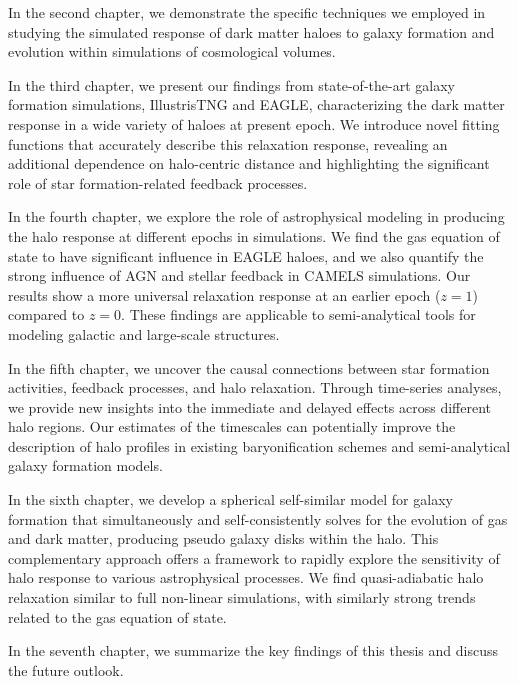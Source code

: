 \documentclass[a4paper, 12pt, oneside]{Thesis}  %
\begin{document}
In the second chapter, we demonstrate the specific techniques we employed in studying the simulated response of dark matter haloes to galaxy formation and evolution within simulations of cosmological volumes.

In the third chapter, we present our findings from state-of-the-art galaxy formation simulations, IllustrisTNG and EAGLE, characterizing the dark matter response in a wide variety of haloes at present epoch. We introduce novel fitting functions that accurately describe this relaxation response, revealing an additional dependence on halo-centric distance and highlighting the significant role of star formation-related feedback processes.

In the fourth chapter, we explore the role of astrophysical modeling in producing the halo response at different epochs in simulations. We find the gas equation of state to have significant influence in EAGLE haloes, and we also quantify the strong influence of AGN and stellar feedback in CAMELS simulations. Our results show a more universal relaxation response at an earlier epoch ($z=1$) compared to $z=0$. These findings are applicable to semi-analytical tools for modeling galactic and large-scale structures.

In the fifth chapter, we uncover the causal connections between star formation activities, feedback processes, and halo relaxation. Through time-series analyses, we provide new insights into the immediate and delayed effects across different halo regions. Our estimates of the timescales can potentially improve the description of halo profiles in existing baryonification schemes and semi-analytical galaxy formation models.

In the sixth chapter, we develop a spherical self-similar model for galaxy formation that simultaneously and self-consistently solves for the evolution of gas and dark matter, producing pseudo galaxy disks within the halo. This complementary approach offers a framework to rapidly explore the sensitivity of halo response to various astrophysical processes. We find quasi-adiabatic halo relaxation similar to full non-linear simulations, with similarly strong trends related to the gas equation of state.

In the seventh chapter, we summarize the key findings of this thesis and discuss the future outlook.

\end{document}

